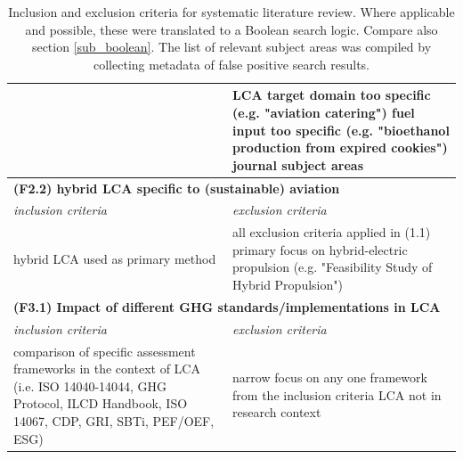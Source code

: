\documentclass{article}
\begin{document}
\begin{table}[H]
\begin{tabularx}{\textwidth}{| X | X |}
                    &
                        LCA target domain too specific \newline (e.g. "aviation catering") \newline
                        fuel input too specific \newline (e.g. "bioethanol production from expired cookies") \newline
                        journal subject areas
                    \\
                    \hline
                \multicolumn{2}{|l|}{\textbf{(F2.2) hybrid LCA specific to (sustainable) aviation}}  \\
                    \hline
                    \textit{inclusion criteria} & \textit{exclusion criteria} \\
                    \hline
                        hybrid LCA used as primary method  \newline
                    &
                        all exclusion criteria applied in (1.1) \newline
                        primary focus on hybrid-electric propulsion \newline
                        (e.g. "Feasibility Study of Hybrid Propulsion")
                    \\
                    \hline
                \multicolumn{2}{|l|}{\textbf{(F3.1) Impact of different GHG standards/implementations in LCA}}  \\
                    \hline
                    \textit{inclusion criteria} & \textit{exclusion criteria} \\
                    \hline
                        comparison of specific assessment frameworks in the context of LCA\newline
                        (i.e. ISO 14040-14044, GHG Protocol, ILCD Handbook, ISO 14067, CDP, GRI, SBTi, PEF/OEF, ESG)
                    &
                        narrow focus on any one framework from the inclusion criteria \newline
                        LCA not in research context
                    \\
                    \hline
                \end{tabularx}
                \caption{Inclusion and exclusion criteria for systematic literature review. Where applicable and possible, these were translated to a Boolean search logic. Compare also section \ref{sub_boolean}. The list of relevant subject areas was compiled by collecting metadata of false positive search results.}
                \label{tab_inclusion_exclusion}
            \end{table}
    
\end{document}
